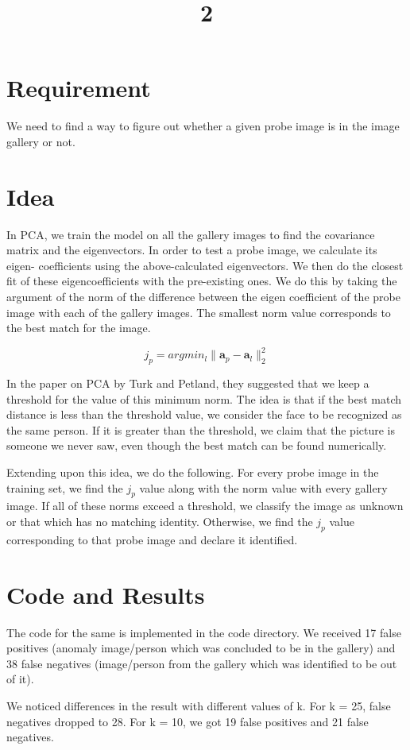 \documentclass[a4paper]{article}
\title{2}
\date{}
\begin{document}
\maketitle
\section{Requirement}
We need to find a way to figure out whether a given probe image is in the image gallery or not.
\section{Idea}
In PCA, we train the model on all the gallery images to find the covariance matrix and the eigenvectors. In order to test a probe image, we calculate its eigen- coefficients using the above-calculated eigenvectors. We then do the closest fit of these eigencoefficients with the pre-existing ones. We do this by taking the argument of the norm of the difference between the eigen coefficient of the probe image with each of the gallery images. The smallest norm value corresponds to the best match for the image.

\[ j_{p} = arg min_{l}\| \textbf{a}_{p} - \textbf{a}_{l}\|_{2}^{2}\]

In the paper on PCA by Turk and Petland, they suggested that we keep a threshold for the value of this minimum norm. The idea is that if the best match distance is less than the threshold value, we consider the face to be recognized as the same person. If it is greater than the threshold, we claim that the picture is someone we never saw, even though the best match can be found numerically.

\medskip

Extending upon this idea, we do the following. For every probe image in the training set, we find the $j_p$ value along with the norm value with every gallery image. If all of these norms exceed a threshold, we classify the image as unknown or that which has no matching identity. Otherwise, we find the $j_p$ value corresponding to that probe image and declare it identified.

\section{Code and Results}
The code for the same is implemented in the code directory. We received  17 false positives (anomaly image/person which was concluded to be in the gallery) and 38 false negatives (image/person from the gallery which was identified to be out of it).

\medskip

We noticed differences in the result with different values of k. For k = 25, false negatives dropped to 28. For k = 10, we got 19 false positives and 21 false negatives. 
\end{document}
